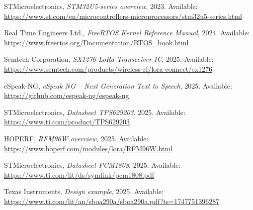 \begin{thebibliography}{1}
STMicroelectronics,
\textit{STM32U5-series overview},
2023.
Available: \url{https://www.st.com/en/microcontrollers-microprocessors/stm32u5-series.html}

Real Time Engineers Ltd.,
\textit{FreeRTOS Kernel Reference Manual},
2024.
Available: \url{https://www.freertos.org/Documentation/RTOS_book.html}

Semtech Corporation,
\textit{SX1276 LoRa Transceiver IC},
2025.
Available: \url{https://www.semtech.com/products/wireless-rf/lora-connect/sx1276}

eSpeak-NG, 
\textit{eSpeak NG -- Next Generation Text to Speech}, 
2025. 
Available: \url{https://github.com/espeak-ng/espeak-ng}

STMicroelectronics,
\textit{Datasheet TPS629203}, 
2025. 
Available: \url{https://www.ti.com/product/TPS629203}

HOPERF,
\textit{RFM96W overview}, 
2025. 
Available: \url{https://www.hoperf.com/modules/lora/RFM96W.html}

STMicroelectronics,
\textit{Datasheet PCM1808}, 
2025. 
Available: \url{https://www.ti.com/lit/ds/symlink/pcm1808.pdf}

Texas Instruments,
\textit{Design example}, 
2025. 
Available: \url{https://www.ti.com/lit/an/sboa290a/sboa290a.pdf?ts=1747751396287}





\end{thebibliography}

